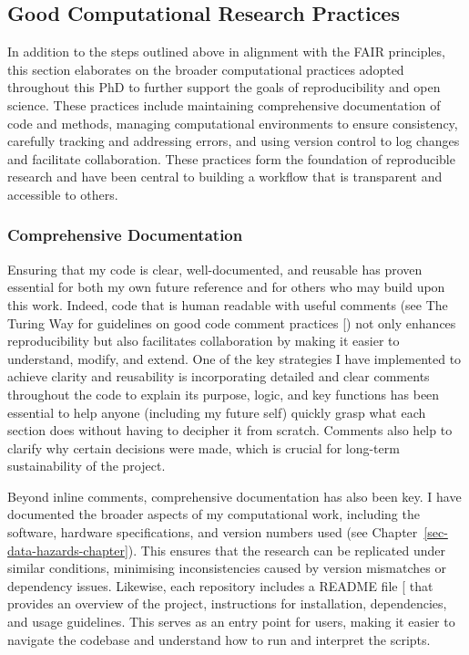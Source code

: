 \documentclass[
  11pt,
  letterpaper,
]{scrreprt}
\begin{document}
\subsection{Good Computational Research
Practices}\label{good-computational-research-practices}

In addition to the steps outlined above in alignment with the FAIR
principles, this section elaborates on the broader computational
practices adopted throughout this PhD to further support the goals of
reproducibility and open science. These practices include maintaining
comprehensive documentation of code and methods, managing computational
environments to ensure consistency, carefully tracking and addressing
errors, and using version control to log changes and facilitate
collaboration. These practices form the foundation of reproducible
research and have been central to building a workflow that is
transparent and accessible to others.

\subsubsection*{Comprehensive
Documentation}\label{comprehensive-documentation}

Ensuring that my code is clear, well-documented, and reusable has proven
essential for both my own future reference and for others who may build
upon this work. Indeed, code that is human readable with useful comments
(see The Turing Way for guidelines on good code comment practices
{[}\citeproc{ref-turingwaycommunity2019TuringWayHandbook}{356}{]}) not
only enhances reproducibility but also facilitates collaboration by
making it easier to understand, modify, and extend. One of the key
strategies I have implemented to achieve clarity and reusability is
incorporating detailed and clear comments throughout the code to explain
its purpose, logic, and key functions has been essential to help anyone
(including my future self) quickly grasp what each section does without
having to decipher it from scratch. Comments also help to clarify why
certain decisions were made, which is crucial for long-term
sustainability of the project.

Beyond inline comments, comprehensive documentation has also been key. I
have documented the broader aspects of my computational work, including
the software, hardware specifications, and version numbers used (see
Chapter~\ref{sec-data-hazards-chapter}). This ensures that the research
can be replicated under similar conditions, minimising inconsistencies
caused by version mismatches or dependency issues. Likewise, each
repository includes a README file
{[}\citeproc{ref-githubREADMEs}{382}{]} that provides an overview of the
project, instructions for installation, dependencies, and usage
guidelines. This serves as an entry point for users, making it easier to
navigate the codebase and understand how to run and interpret the
scripts.
\end{document}

